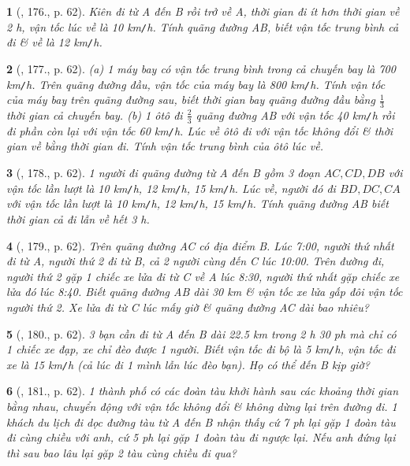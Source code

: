 \documentclass{article}
\newtheorem{baitoan}{}
\begin{document}
\begin{baitoan}[\cite{Binh_Toan_6_tap_2}, 176., p. 62]
	Kiên đi từ A đến B rồi trở về A, thời gian đi ít hơn thời gian về {\rm2 h}, vận tốc lúc về là {\rm10 km{\tt/}h}. Tính quãng đường AB, biết vận tốc trung bình cả đi \& về là {\rm12 km{\tt/}h}.
\end{baitoan}

\begin{baitoan}[\cite{Binh_Toan_6_tap_2}, 177., p. 62]
	(a) 1 máy bay có vận tốc trung bình trong cả chuyến bay là {\rm700 km{\tt/}h}. Trên quãng đường đầu, vận tốc của máy bay là {\rm800 km{\tt/}h}. Tính vận tốc của máy bay trên quãng đường sau, biết thời gian bay quãng đường đầu bằng $\frac{1}{3}$ thời gian cả chuyến bay. (b) 1 ôtô đi $\frac{2}{3}$ quãng đường AB với vận tốc {\rm40 km{\tt/}h} rồi đi phần còn lại với vận tốc {\rm60 km{\tt/}h}. Lúc về ôtô đi với vận tốc không đổi \& thời gian về bằng thời gian đi. Tính vận tốc trung bình của ôtô lúc về.
\end{baitoan}

\begin{baitoan}[\cite{Binh_Toan_6_tap_2}, 178., p. 62]
	1 người đi quãng đường từ A đến B gồm 3 đoạn $AC,CD,DB$ với vận tốc lần lượt là {\rm10 km{\tt/}h, 12 km{\tt/}h, 15 km{\tt/}h}. Lúc về, người đó đi $BD,DC,CA$ với vận tốc lần lượt là {\rm10 km{\tt/}h, 12 km{\tt/}h, 15 km{\tt/}h}. Tính quãng đường AB biết thời gian cả đi lẫn về hết {\rm3 h}.
\end{baitoan}

\begin{baitoan}[\cite{Binh_Toan_6_tap_2}, 179., p. 62]
	Trên quãng đường AC có địa điểm B. Lúc {\rm7:00}, người thứ nhất đi từ A, người thứ 2 đi từ B, cả 2 người cùng đến C lúc {\rm10:00}. Trên đường đi, người thứ 2 gặp 1 chiếc xe lửa đi từ C về A lúc {\rm8:30}, người thứ nhất gặp chiếc xe lửa đó lúc {\rm8:40}. Biết quãng đường AB dài {\rm30 km} \& vận tốc xe lửa gấp đôi vận tốc người thứ 2. Xe lửa đi từ C lúc mấy giờ \& quãng đường AC dài bao nhiêu?
\end{baitoan}

\begin{baitoan}[\cite{Binh_Toan_6_tap_2}, 180., p. 62]
	3 bạn cần đi từ A đến B dài {\rm22.5 km} trong {\rm2 h 30 ph} mà chỉ có 1 chiếc xe đạp, xe chỉ đèo được 1 người. Biết vận tốc đi bộ là {\rm5 km{\tt/}h}, vận tốc đi xe là {\rm15 km{\tt/}h} (cả lúc đi 1 mình lẫn lúc đèo bạn). Họ có thể đến B kịp giờ?
\end{baitoan}

\begin{baitoan}[\cite{Binh_Toan_6_tap_2}, 181., p. 62]
	1 thành phố có các đoàn tàu khởi hành sau các khoảng thời gian bằng nhau, chuyển động với vận tốc không đổi \& không dừng lại trên đường đi. 1 khách du lịch đi dọc đường tàu từ A đến B nhận thấy cứ {\rm7 ph} lại gặp 1 đoàn tàu đi cùng chiều với anh, cứ {\rm5 ph} lại gặp 1 đoàn tàu đi ngược lại. Nếu anh đứng lại thì sau bao lâu lại gặp 2 tàu cùng chiều đi qua?
\end{baitoan}
\end{document}
